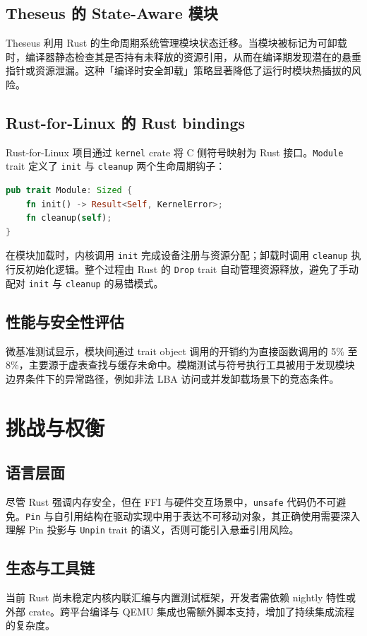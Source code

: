 \section{Theseus 的 State-Aware 模块}
Theseus 利用 Rust 的生命周期系统管理模块状态迁移。当模块被标记为可卸载时，编译器静态检查其是否持有未释放的资源引用，从而在编译期发现潜在的悬垂指针或资源泄漏。这种「编译时安全卸载」策略显著降低了运行时模块热插拔的风险。\par
\section{Rust-for-Linux 的 Rust bindings}
Rust-for-Linux 项目通过 \texttt{kernel} crate 将 C 侧符号映射为 Rust 接口。\texttt{Module} trait 定义了 \texttt{init} 与 \texttt{cleanup} 两个生命周期钩子：\par
\begin{lstlisting}[language=rust]
pub trait Module: Sized {
    fn init() -> Result<Self, KernelError>;
    fn cleanup(self);
}
\end{lstlisting}
在模块加载时，内核调用 \texttt{init} 完成设备注册与资源分配；卸载时调用 \texttt{cleanup} 执行反初始化逻辑。整个过程由 Rust 的 \texttt{Drop} trait 自动管理资源释放，避免了手动配对 \texttt{init} 与 \texttt{cleanup} 的易错模式。\par
\section{性能与安全性评估}
微基准测试显示，模块间通过 trait object 调用的开销约为直接函数调用的 5\%{} 至 8\%{}，主要源于虚表查找与缓存未命中。模糊测试与符号执行工具被用于发现模块边界条件下的异常路径，例如非法 LBA 访问或并发卸载场景下的竞态条件。\par
\chapter{挑战与权衡}
\section{语言层面}
尽管 Rust 强调内存安全，但在 FFI 与硬件交互场景中，\texttt{unsafe} 代码仍不可避免。\texttt{Pin} 与自引用结构在驱动实现中用于表达不可移动对象，其正确使用需要深入理解 Pin 投影与 \texttt{Unpin} trait 的语义，否则可能引入悬垂引用风险。\par
\section{生态与工具链}
当前 Rust 尚未稳定内核内联汇编与内置测试框架，开发者需依赖 nightly 特性或外部 crate。跨平台编译与 QEMU 集成也需额外脚本支持，增加了持续集成流程的复杂度。\par
